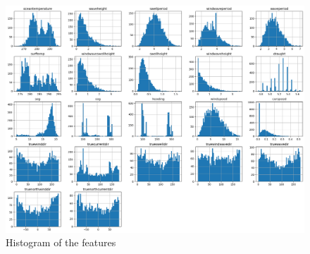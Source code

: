 

\begin{figure}
    \includegraphics[width=\linewidth,height=\textheight,keepaspectratio]{02_figures/outputhist.png}
    \caption{Histogram of the features}
    \label{sidewaysfig:hist1}
\end{figure}

\newpage

